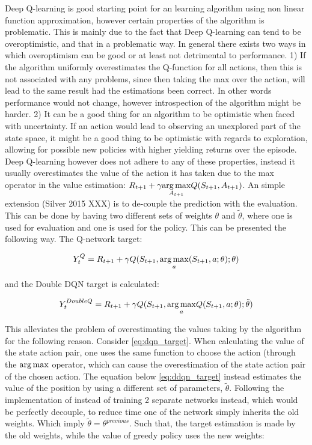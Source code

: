 Deep Q-learning is good starting point for an learning algorithm using non linear function approximation, however certain properties of the algorithm is problematic. This is mainly due to the fact that Deep Q-learning can tend to be overoptimistic, and that in a problematic way. In general there exists two ways in which overoptimism can be good or at least not detrimental to performance. 1) If the algorithm uniformly overestimates the Q-function for all actions, then this is not associated with any problems, since then taking the max over the action, will lead to the same result had the estimations been correct. In other words performance would not change, however introspection of the algorithm might be harder. 2) It can be a good thing for an algorithm to be optimistic when faced with uncertainty. If an action would lead to observing an unexplored part of the state space, it might be a good thing to be optimistic with regards to exploration, allowing for possible new policies with higher yielding returns over the episode. Deep Q-learning however does not adhere to any of these properties, instead it usually overestimates the value of the action it has taken due to the max operator in the value estimation: $R_{t+1} + \gamma \underset{A_{t+1}}{\operatorname*{arg\,max}} Q(S_{t+1}, A_{t+1})$. An simple extension (Silver 2015 XXX) is to de-couple the prediction with the evaluation. This can be done by having two different sets of weights $\theta$ and $\tilde{\theta}$, where one is used for evaluation and one is used for the policy. This can be presented the following way. The Q-network target:

\begin{equation}\label{eq:dqn_target}
    Y_t^{Q} = R_{t+1} + \gamma Q(S_{t+1}, \underset{a}{\operatorname*{arg\,max}} (S_{t+1}, a ; \theta) ; \theta)
\end{equation}

and the Double DQN target is calculated:

\begin{equation}\label{eq:ddqn_target}
    Y_t^{DoubleQ} = R_{t+1} + \gamma Q(S_{t+1}, \underset{a}{\operatorname*{arg\,max}}Q(S_{t+1}, a; \theta); \tilde{\theta}) 
\end{equation}

This alleviates the problem of overestimating the values taking by the algorithm for the following reason. Consider \eqref{eq:dqn_target}. When calculating the value of the state action pair, one uses the same function to choose the action (through the $\operatorname*{arg\,max}$ operator, which can cause the overestimation of the state action pair of the chosen action. The equation below \eqref{eq:ddqn_target} instead estimates the value of the position by using a different set of parameters, $\tilde{\theta}$. Following the implementation of \parencite{van_hasselt_deep_2015} instead of training 2 separate networks instead, which would be perfectly decouple, to reduce time one of the network simply inherits the old weights. Which imply $\tilde{\theta} = \theta^{previous}$. Such that, the target estimation is made by the old weights, while the value of greedy policy uses the new weights:

